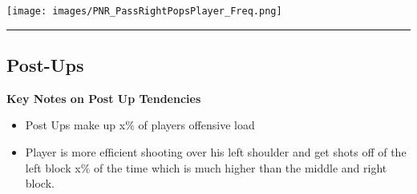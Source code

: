 \documentclass[a4paper,12pt]{article}
\begin{document}
\begin{table}[H]
{\begin{minipage}[t]{0.6\textwidth}
{\begin{tabular}
                
            
                
            
                
            
                
            
                
            
                
            
                
            
                
            
                
            
                
            

            \bottomrule
        \end{tabular}
        } %
    \end{minipage}
    } %
    \hfill %
    \begin{minipage}[c]{0.35\textwidth} %
        \flushright
        \texttt{[image: images/PNR\_PassRightPopsPlayer\_Freq.png]} %
    \end{minipage}
\end{table}

\vspace{-1em} %
\hrule height 1pt width 1\textwidth %
\vspace{1em} %

\clearpage

\subsection{Post-Ups}

\vspace{1.25em} %
\textbf{Key Notes on Post Up Tendencies}
\vspace{0.5em} %

\begin{itemize}
    \item Post Ups make up x\% of players offensive load
    \vspace{0.3em} %
    \item Player is more efficient shooting over his left shoulder and get shots off of the left block x\% of the time which is much higher than the middle and right block.
\end{itemize}
\end{document}
